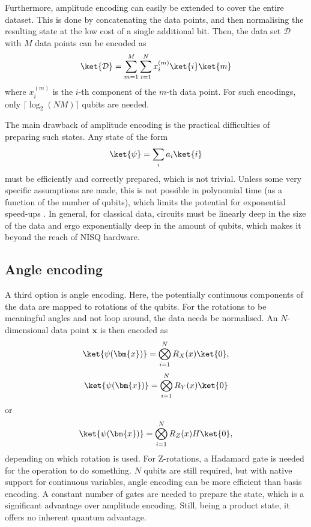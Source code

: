 Furthermore, amplitude encoding can easily be extended to cover the entire dataset.
This is done by concatenating the data points, and then normalising the resulting state at the low cost of a single additional bit.
Then, the data set $\mathcal{D}$ with $M$ data points can be encoded as
\begin{equation}
    \ket{\mathcal{D}} = \sum_{m=1}^M \sum_{i=1}^{N} x_i^{(m)} \ket{i} \ket{m}
\end{equation}
where $x_i^{(m)}$ is the $i$-th component of the $m$-th data point.
For such encodings, only $\lceil \log_2 (N M) \rceil$ qubits are needed.

The main drawback of amplitude encoding is the practical difficulties of preparing such states.
Any state of the form
\begin{equation}
    \ket{\psi} = \sum_{i} a_i \ket{i}
\end{equation}
must be efficiently and correctly prepared, which is not trivial.
Unless some very specific assumptions are made, this is not possible in polynomial time (as a function of the number of qubits), which limits the potential for exponential speed-ups \cite{textbook}.
In general, for classical data, circuits must be linearly deep in the size of the data and ergo exponentially deep in the amount of qubits, which makes it beyond the reach of NISQ hardware.

\subsection{Angle encoding}
A third option is angle encoding.
Here, the potentially continuous components of the data are mapped to rotations of the qubits.
For the rotations to be meaningful angles and not loop around, the data needs be normalised.
An $N$-dimensional data point $\bm{x}$ is then encoded as
\begin{equation}
    \ket{\psi(\bm{x})} = \bigotimes_{i=1}^{N} R_X(x) \ket{0},
\end{equation}
\begin{equation}
    \ket{\psi(\bm{x})} = \bigotimes_{i=1}^{N} R_Y(x) \ket{0}
\end{equation}
or
\begin{equation}
    \ket{\psi(\bm{x})} = \bigotimes_{i=1}^{N} R_Z(x) H \ket{0},
\end{equation}
depending on which rotation is used.
For Z-rotations, a Hadamard gate is needed for the operation to do something.
$N$ qubits are still required, but with native support for continuous variables, angle encoding can be more efficient than basis encoding.
A constant number of gates are needed to prepare the state, which is a significant advantage over amplitude encoding.
Still, being a product state, it offers no inherent quantum advantage.


